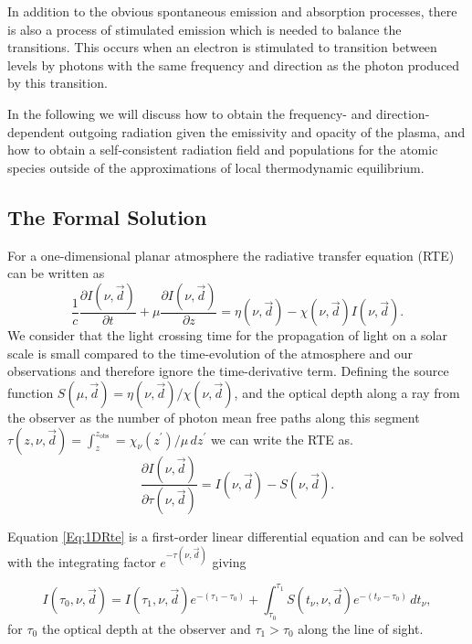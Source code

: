In addition to the obvious spontaneous emission and absorption processes, there is also a process of stimulated emission which is needed to balance the transitions. This occurs when an electron is stimulated to transition between levels by photons with the same frequency and direction as the photon produced by this transition.

In the following we will discuss how to obtain the frequency- and direction-dependent outgoing radiation given the emissivity and opacity of the plasma, and how to obtain a self-consistent radiation field and populations for the atomic species outside of the approximations of local thermodynamic equilibrium.

\subsection{The Formal Solution}

For a one-dimensional planar atmosphere the radiative transfer equation (RTE) can be written as
\begin{equation}
    \frac{1}{c}\frac{\partial I(\nu, \vec{d})}{\partial t} + \mu \frac{\partial I(\nu, \vec{d})}{\partial z} = \eta(\nu, \vec{d}) - \chi(\nu, \vec{d})I(\nu, \vec{d}).
\end{equation}
We consider that the light crossing time for the propagation of light on a solar scale is small compared to the time-evolution of the atmosphere and our observations and therefore ignore the time-derivative term.
Defining the source function $S(\mu, \vec{d}) = \eta(\nu, \vec{d}) / \chi(\nu, \vec{d})$, and the optical depth along a ray from the observer as the number of photon mean free paths along this segment $\tau(z, \nu, \vec{d}) = \int_z^{z_{\mathrm{obs}}} = \chi_\nu(z^\prime) / \mu\, dz^\prime$ we can write the RTE as.
\begin{equation}
    \frac{\partial I(\nu, \vec{d})}{\partial \tau(\nu, \vec{d})} = I(\nu, \vec{d}) - S(\nu, \vec{d}).
    \label{Eq:1DRte}
\end{equation}

Equation \ref{Eq:1DRte} is a first-order linear differential equation and can be solved with the integrating factor $e^{-\tau(\nu, \vec{d})}$ giving

\begin{equation}
I(\tau_0, \nu, \vec{d}) = I(\tau_1, \nu, \vec{d}) e^{-(\tau_1 - \tau_0)} + \int_{\tau_0}^{\tau_1}S(t_\nu, \nu, \vec{d})e^{-(t_\nu - \tau_0)}\, dt_\nu,
\label{Eq:IntegratedRte}
\end{equation}
for $\tau_0$ the optical depth at the observer and $\tau_1 > \tau_0$ along the line of sight.


